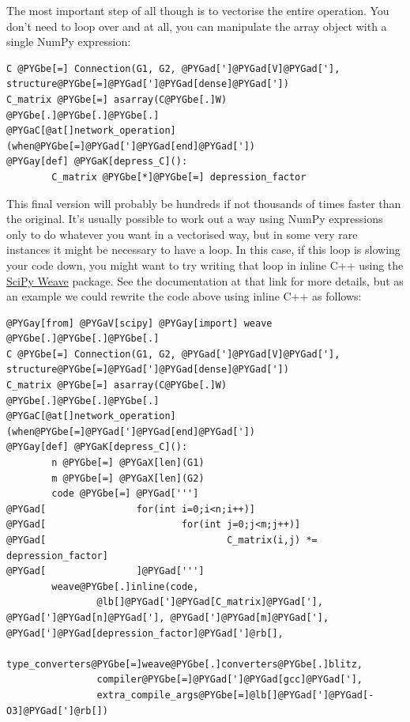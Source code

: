 \documentclass[letterpaper,10pt]{manual}
\begin{document}
The most important step of all though is to vectorise the entire operation. You
don't need to loop over  and  at all, you can manipulate the array
object with a single NumPy expression:

\begin{Verbatim}[commandchars=@\[\]]
C @PYGbe[=] Connection(G1, G2, @PYGad[']@PYGad[V]@PYGad['], structure@PYGbe[=]@PYGad[']@PYGad[dense]@PYGad['])
C_matrix @PYGbe[=] asarray(C@PYGbe[.]W)
@PYGbe[.]@PYGbe[.]@PYGbe[.]
@PYGaC[@at[]network_operation](when@PYGbe[=]@PYGad[']@PYGad[end]@PYGad['])
@PYGay[def] @PYGaK[depress_C]():
        C_matrix @PYGbe[*]@PYGbe[=] depression_factor
\end{Verbatim}

This final version will probably be hundreds if not thousands of times faster
than the original. It's usually possible to work out a way using NumPy
expressions only to do whatever you want in a vectorised way, but in some
very rare instances it might be necessary to have a loop. In this case, if
this loop is slowing your code down, you might want to try writing that
loop in inline C++ using the \href{http://www.scipy.org/Weave}{SciPy Weave}
package. See the documentation at that link for more details, but as an
example we could rewrite the code above using inline C++ as follows:

\begin{Verbatim}[commandchars=@\[\]]
@PYGay[from] @PYGaV[scipy] @PYGay[import] weave
@PYGbe[.]@PYGbe[.]@PYGbe[.]
C @PYGbe[=] Connection(G1, G2, @PYGad[']@PYGad[V]@PYGad['], structure@PYGbe[=]@PYGad[']@PYGad[dense]@PYGad['])
C_matrix @PYGbe[=] asarray(C@PYGbe[.]W)
@PYGbe[.]@PYGbe[.]@PYGbe[.]
@PYGaC[@at[]network_operation](when@PYGbe[=]@PYGad[']@PYGad[end]@PYGad['])
@PYGay[def] @PYGaK[depress_C]():
        n @PYGbe[=] @PYGaX[len](G1)
        m @PYGbe[=] @PYGaX[len](G2)
        code @PYGbe[=] @PYGad[''']
@PYGad[                for(int i=0;i<n;i++)]
@PYGad[                        for(int j=0;j<m;j++)]
@PYGad[                                C_matrix(i,j) *= depression_factor]
@PYGad[                ]@PYGad[''']
        weave@PYGbe[.]inline(code,
                @lb[]@PYGad[']@PYGad[C_matrix]@PYGad['], @PYGad[']@PYGad[n]@PYGad['], @PYGad[']@PYGad[m]@PYGad['], @PYGad[']@PYGad[depression_factor]@PYGad[']@rb[],
                type_converters@PYGbe[=]weave@PYGbe[.]converters@PYGbe[.]blitz,
                compiler@PYGbe[=]@PYGad[']@PYGad[gcc]@PYGad['],
                extra_compile_args@PYGbe[=]@lb[]@PYGad[']@PYGad[-O3]@PYGad[']@rb[])
\end{Verbatim}
\end{document}
